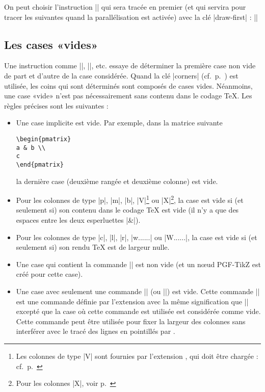 \documentclass[dvipsnames]{article}%
\begin{document}
\medskip
{}
On peut choisir l'instruction |\Ddots| qui sera tracée en premier (et qui
servira pour tracer les suivantes quand la parallélisation est activée) avec la
clé |draw-first| : ||

\subsection{Les cases «vides»}

\label{empty-cells}
Une instruction comme |\Ldots|, |\Cdots|, etc. essaye de déterminer la première
case non vide de part et d'autre de la case considérée. Quand la clé |corners|
(cf.~p.~\pageref{corners}) est utilisée, les coins qui sont déterminés sont
composés de cases vides. Néanmoins, une case «vide» n'est pas nécessairement
sans contenu dans le codage TeX. Les règles précises sont les suivantes :

\begin{itemize}
\item Une case implicite est vide. Par exemple, dans la matrice suivante

\begin{Verbatim}
\begin{pmatrix}
a & b \\
c
\end{pmatrix}
\end{Verbatim}

la dernière case (deuxième rangée et deuxième colonne) est vide.

\medskip
\item Pour les colonnes de type |p|, |m|, |b|, |V|\footnote{Les colonnes de type
  |V| sont fournies par l'extension , qui doit être chargée : cf.~p.~\pageref{varwidth}}
ou |X|\footnote{Pour les colonnes |X|, voir p.~\pageref{colonne-X}}, la case est vide si (et seulement
si) son contenu dans le codage TeX est vide (il n'y a que des espaces entre les
deux esperluettes |&|).

\medskip
\item Pour les colonnes de type |c|, |l|, |r|, |w{...}{...}| ou |W{...}{...}|,
la case est vide si (et seulement si) son rendu TeX est de largeur nulle.

\medskip
\item Une case qui contient la commande |\NotEmpty| est non vide (et un nœud
PGF-TikZ est créé pour cette case).

\medskip
\item Une case avec seulement une commande |\Hspace| (ou |\Hspace*|) est vide.
Cette commande |\Hspace| est une commande définie par l'extension
 avec la même signification que |\hspace| excepté que la case où
cette commande est utilisée est considérée comme vide. Cette commande peut être
utilisée pour fixer la largeur des colonnes sans interférer avec le tracé des
lignes en pointillés par .
\end{itemize}
\end{document}
